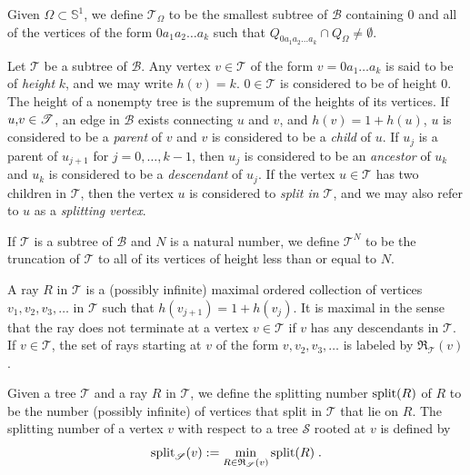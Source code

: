 \documentclass[12pt]{amsart}
\numberwithin{equation}{section}
\theoremstyle{definition}
\theoremstyle{remark}
\begin{document}


Given $\Omega \subset \mathbb{S}^{1}$, we define $\mathscr{T}_\Omega$ to be the smallest subtree of $\mathscr{B}$  containing 0 and all of the vertices of the form $0 a_1 a_2 \ldots a_k$ such that $Q_{0 a_1 a_2 \ldots a_k} \cap Q_\Omega \neq \emptyset$.

Let $\mathscr{T}$ be a subtree of $\mathscr{B}$.   Any vertex $v \in \mathscr{T}$ of the form $v = 0 a_1 \ldots a_k$ is said to be of \emph{height} $k$, and we may write $h(v)= k$.  $0 \in \mathscr{T}$ is considered to be of height $0$.   The height of a nonempty tree is the supremum of the heights of its vertices.  If $u \textup{,} v \in \mathscr{T}$, an edge in $\mathscr{B}$ exists connecting $u$ and $v$, and $h(v) = 1 + h(u)$, $u$ is considered to be a \emph{parent} of $v$ and $v$ is considered to be a \emph{child} of $u$.     If $u_j$ is a parent of $u_{j+1}$ for $j = 0, \ldots, k - 1$, then $u_j$ is considered to be an \emph{ancestor} of $u_k$ and $u_k$ is considered to be a \emph{descendant} of $u_j$.  If the vertex $u \in \mathscr{T}$ has two children in $\mathscr{T}$, then the vertex $u$ is considered to \emph{split in $\mathscr{T}$}, and we may also refer to $u$ as a \emph{splitting vertex}.  

If $\mathscr{T}$ is a subtree of $\mathscr{B}$ and $N$ is a natural number, we define $\mathscr{T}^N$ to be the truncation of $\mathscr{T}$ to all of its vertices of height less than or equal to $N$.

A ray $R$ in $\mathscr{T}$ is a (possibly infinite) maximal ordered collection of vertices $v_1, v_2, v_3, \ldots$ in $\mathscr{T}$ such that $h(v_{j+1}) = 1 + h(v_j)$.  It is maximal in the sense that the ray does not terminate at a vertex $v \in \mathscr{T}$ if $v$ has any descendants in $\mathscr{T}$.   If $v \in \mathscr{T}$, the set of rays starting at $v$ of the form $v, v_2, v_3, \ldots$ is labeled by $\mathfrak{R}_{\mathscr{T}}(v)$.

Given a tree $\mathscr{T}$ and a ray $R$ in $\mathscr{T}$, we define the splitting number $\textup{split}(R)$ of  $R$ to be the number (possibly infinite) of vertices that split in $\mathscr{T}$ that lie on $R$.   The splitting number of a vertex $v$  with  respect to a tree $\mathscr{S}$ rooted at $v$ is defined by
$$\textup{split}_\mathscr{S} (v) := \min_{R \in \mathfrak{R}_{\mathscr{S}}(v)} \textup{split}(R)\;.$$  
\end{document}
